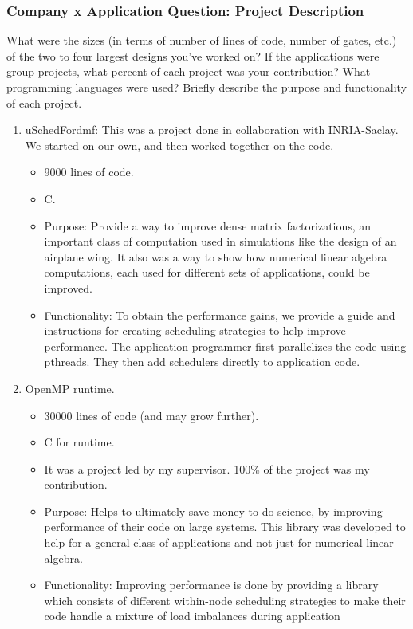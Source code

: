 \begin{frame}
\frametitle{Company x Application Question: Project Description}
{\tiny What were the sizes (in terms of number of lines of code, number of
gates, etc.) of the two to four largest designs you've worked on? If
the applications were group projects, what percent of each project was
your contribution? What programming languages were used? Briefly
describe the purpose and functionality of each project.}
\begin{enumerate}
\tiny \item \tiny uSchedFordmf: This was a project done in collaboration with
  INRIA-Saclay. We started on our own, and then worked together on the
  code.  
\begin{itemize}
\tiny \item \tiny 9000 lines of code. 
\item \tiny C.
\item \tiny Purpose: Provide a way to improve dense matrix
  factorizations, an important class of computation used in 
  simulations like the design of an airplane wing. It also was a way
  to show how numerical linear algebra computations, each used for
  different sets of applications, could be improved. 
\item \tiny Functionality: To obtain the performance gains, we provide a guide and instructions for creating
  scheduling strategies to help improve performance. The application
  programmer first parallelizes the code using pthreads. They then add
  schedulers directly to application code.  
\end{itemize}
\item \tiny OpenMP runtime. 
\begin{itemize} 
\tiny \item \tiny 30000 lines of code (and may grow further). 
\item \tiny C for runtime. 
\item \tiny It was a project led by my supervisor. 100\% of the
  project was my contribution.
\item \tiny Purpose: Helps to ultimately save money to do
  science, by improving performance of their code on large
  systems. This library was developed to help for a general class 
  of applications and not just for numerical linear algebra. 
\item \tiny Functionality: Improving performance is done by providing a
  library which consists of different within-node scheduling strategies to make
  their code handle a mixture of load imbalances during application 

\end{itemize}
\end{enumerate}
\end{frame}
